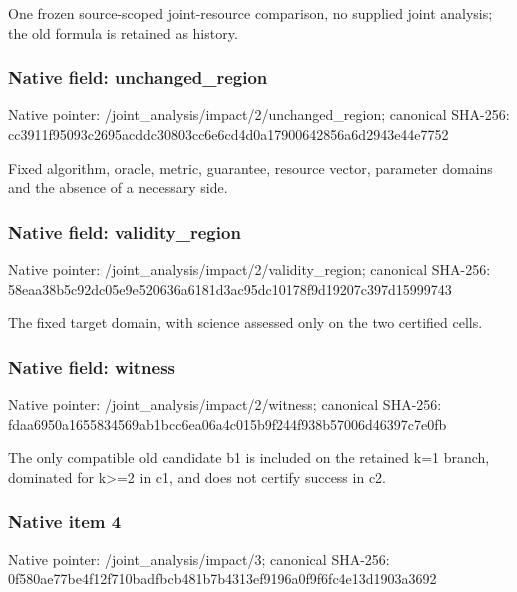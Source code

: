 \documentclass[10pt,a4paper]{article}
\begin{document}
\begingroup\raggedright\sloppy One frozen source-scoped joint-resource comparison,\allowbreak{} no supplied joint analysis;\allowbreak{} the old formula is retained as history.\par\endgroup

\subsubsection{Native field: unchanged\_\allowbreak{}region}
Native pointer: /joint\_\allowbreak{}analysis/impact/2/unchanged\_\allowbreak{}region; canonical SHA-256: cc3911f95093c2695acddc30803cc6e6cd4d0a17900642856a6d2943e44e7752

\begingroup\raggedright\sloppy Fixed algorithm,\allowbreak{} oracle,\allowbreak{} metric,\allowbreak{} guarantee,\allowbreak{} resource vector,\allowbreak{} parameter domains and the absence of a necessary side.\par\endgroup

\subsubsection{Native field: validity\_\allowbreak{}region}
Native pointer: /joint\_\allowbreak{}analysis/impact/2/validity\_\allowbreak{}region; canonical SHA-256: 58eaa38b5c92dc05e9e520636a6181d3ac95dc10178f9d19207c397d15999743

\begingroup\raggedright\sloppy The fixed target domain,\allowbreak{} with science assessed only on the two certified cells.\par\endgroup

\subsubsection{Native field: witness}
Native pointer: /joint\_\allowbreak{}analysis/impact/2/witness; canonical SHA-256: fdaa6950a1655834569ab1bcc6ea06a4c015b9f244f938b57006d46397c7e0fb

\begingroup\raggedright\sloppy The only compatible old candidate b1 is included on the retained k=\allowbreak{}1 branch,\allowbreak{} dominated for k>=\allowbreak{}2 in c1,\allowbreak{} and does not certify success in c2.\par\endgroup

\subsubsection{Native item 4}
Native pointer: /joint\_\allowbreak{}analysis/impact/3; canonical SHA-256: 0f580ae77be4f12f710badfbcb481b7b4313ef9196a0f9f6fc4e13d1903a3692
\end{document}
